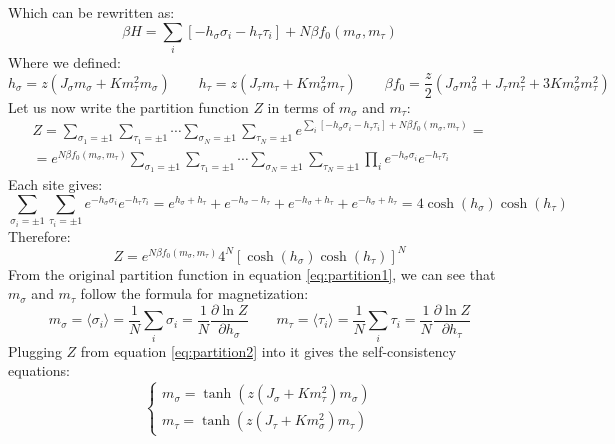 \documentclass{article}
\begin{document}
Which can be rewritten as:
\begin{equation}
    \beta H = \sum_i \left[-h_\sigma \sigma_i - h_\tau \tau_i\right] + N\beta f_0(m_\sigma, m_\tau)
\end{equation}
Where we defined:
\begin{equation}
    h_\sigma = z(J_\sigma m_\sigma + K m_\tau^2m_\sigma)
    \qquad
    h_\tau = z(J_\tau m_\tau + K m_\sigma^2m_\tau)
    \qquad
    \beta f_0 = \frac{z}{2}\left(
        J_\sigma m_\sigma^2 + J_\tau m_\tau^2 + 3Km_\sigma^2m_\tau^2
    \right)
\end{equation}
Let us now write the partition function $Z$ in terms of $m_\sigma$ and $m_\tau$:
\begin{equation}
\label{eq:partition1}
\begin{gathered}
    Z = \sum_{\sigma_1=\pm1}\sum_{\tau_1=\pm1}\cdots\sum_{\sigma_N=\pm1}\sum_{\tau_N=\pm1}e^{\sum_i \left[-h_\sigma \sigma_i - h_\tau \tau_i\right] + N\beta f_0(m_\sigma, m_\tau)} = \\ =
    e^{N\beta f_0(m_\sigma, m_\tau)}\sum_{\sigma_1=\pm1}\sum_{\tau_1=\pm1}\cdots\sum_{\sigma_N=\pm1}\sum_{\tau_N=\pm1}\prod_i e^{-h_\sigma \sigma_i}e^{- h_\tau \tau_i}
\end{gathered}
\end{equation}
Each site gives:
\begin{equation}
    \sum_{\sigma_i=\pm1}\sum_{\tau_i=\pm1} e^{-h_\sigma \sigma_i}e^{- h_\tau \tau_i} = e^{h_\sigma + h_\tau} + e^{-h_\sigma - h_\tau} + e^{-h_\sigma + h_\tau} + e^{-h_\sigma + h_\tau} = 4\cosh(h_\sigma)\cosh(h_\tau)
\end{equation}
Therefore:
\begin{equation}
\label{eq:partition2}
    Z = e^{N\beta f_0(m_\sigma, m_\tau)}4^N\left[\cosh(h_\sigma)\cosh(h_\tau)\right]^N
\end{equation}
From the original partition function in equation \ref{eq:partition1}, we can see that $m_\sigma$ and $m_\tau$ follow the formula for magnetization:
\begin{equation}
    m_\sigma = \langle \sigma_i \rangle = \frac{1}{N}\sum_i \sigma_i = \frac{1}{N}\frac{\partial \ln Z}{\partial h_\sigma}
    \qquad
    m_\tau = \langle \tau_i \rangle = \frac{1}{N}\sum_i \tau_i = \frac{1}{N}\frac{\partial \ln Z}{\partial h_\tau}
\end{equation}
Plugging $Z$ from equation \ref{eq:partition2} into it gives the self-consistency equations:
\begin{equation}
\begin{cases}
    m_\sigma = \tanh(z(J_\sigma + K m_\tau^2)m_\sigma)
    \\
    m_\tau = \tanh(z(J_\tau + K m_\sigma^2)m_\tau)
\end{cases}
\end{equation}
\end{document}
